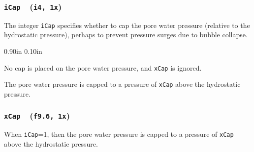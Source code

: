 \documentclass[letterpaper,11pt]{article}
\newcommand{\Var}[2]{\texttt{#1}\ \  (\texttt{#2})}
\newlength{\Labelwidth}
\newcommand{\Entrylabel}[1]{\makebox[\Labelwidth][r]{\texttt{#1}}}
\newenvironment{Options}
{\begin{list}{}{%
\renewcommand{\makelabel}{\Entrylabel}%
\setlength{\leftmargin} {0.90in}%
\setlength{\rightmargin}{0.00in}%
\setlength{\labelsep}   {0.10in}%
\setlength{\labelwidth} {\Labelwidth}%
}}
{\end{list}}
\begin{document}
\subsubsection[\texttt{iCap}]{\Var{iCap}{i4, 1x}}\label{sec:iCap}
The integer \texttt{iCap} specifies whether to cap
the pore water pressure (relative to the
hydrostatic pressure), perhaps to prevent pressure surges 
due to bubble collapse.
\begin{Options}
  \item[iCap=0]
    No cap is placed on the pore water pressure,
    and \texttt{xCap} is ignored.
  \item[iCap=1]
    The pore water pressure is capped to a pressure of \texttt{xCap}
    above the hydrostatic pressure.
\end{Options}
%
%
\subsubsection[\texttt{xCap}]{\Var{xCap}{f9.6, 1x}}\label{sec:xCap}
When \texttt{iCap}=1, then the
pore water pressure is capped to a pressure of \texttt{xCap}
above the hydrostatic pressure.
%
%
\end{document}
